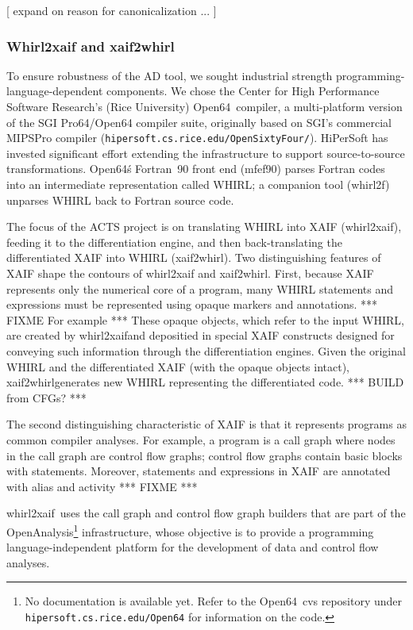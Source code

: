 \documentclass[acmtocl,acmnow]{acmtrans2m}
\newcommand{\OpenSixtyFour}{Open64}
\newcommand{\OpenAnalysis}{OpenAnalysis}
\newcommand{\whirlToxaif}{whirl2xaif}
\newcommand{\xaifTowhirl}{xaif2whirl}
\begin{document}
[ expand on reason for canonicalization ... ]

\subsubsection*{Whirl2xaif and xaif2whirl}

To ensure robustness of the AD tool, we sought industrial strength
programming-language-dependent components.  We chose the Center for High
Performance Software Research's (Rice University) \OpenSixtyFour\
compiler, a multi-platform version of the SGI Pro64/Open64 compiler
suite, originally based on SGI's commercial MIPSPro compiler 
({\tt hipersoft.cs.rice.edu/OpenSixtyFour/}).  HiPerSoft
has invested significant effort extending the infrastructure to
support source-to-source transformations.  \OpenSixtyFour\'s
Fortran~90 front end (mfef90) parses Fortran codes into an intermediate
representation called WHIRL; a companion tool (whirl2f) unparses WHIRL
back to Fortran source code.

The focus of the ACTS project is on translating WHIRL into XAIF
(\whirlToxaif), feeding it to the differentiation engine, and then
back-translating the differentiated XAIF into WHIRL (\xaifTowhirl).
Two distinguishing features of XAIF shape the contours of \whirlToxaif
and \xaifTowhirl.  First, because XAIF represents only the numerical
core of a program, many WHIRL statements and expressions must be
represented using opaque markers and annotations.  
*** FIXME For example *** 
These opaque objects, which refer to the input WHIRL, are created by
\whirlToxaif and depositied in special XAIF constructs designed for
conveying such information through the differentiation engines.  Given
the original WHIRL and the differentiated XAIF (with the opaque
objects intact), \xaifTowhirl generates new WHIRL representing the
differentiated code. *** BUILD from CFGs? ***

The second distinguishing characteristic of XAIF is that it represents
programs as common compiler analyses.  For example, a program is a
call graph where nodes in the call graph are control flow graphs;
control flow graphs contain basic blocks with statements.  Moreover,
statements and expressions in XAIF are annotated with alias and
activity  *** FIXME ***

 \whirlToxaif\ uses the call graph and control flow graph builders
that are part of the \OpenAnalysis\footnote{No documentation is
available yet.  Refer to the \OpenSixtyFour\ cvs repository under {\tt
hipersoft.cs.rice.edu/Open64} for information on the code.}
infrastructure, whose objective is to provide a programming
language-independent platform for the development of data and control
flow analyses.
\end{document}
